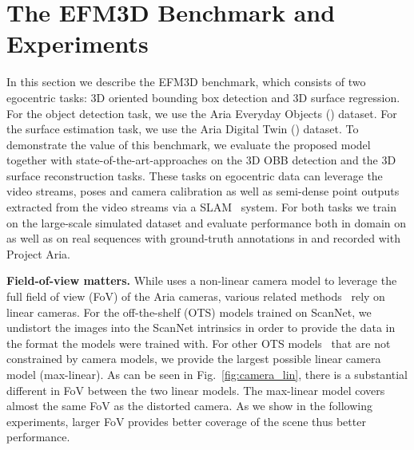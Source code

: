 \section{The EFM3D Benchmark and Experiments}
In this section we describe the EFM3D benchmark, which consists of two egocentric tasks: 3D oriented bounding box detection and 3D surface regression. For the object detection task, we use the Aria Everyday Objects (\AEO{}) dataset. For the surface estimation task, we use the Aria Digital Twin (\ADT{}) dataset.
%
To demonstrate the value of this benchmark, we evaluate the proposed \EFMmodel{} model together with state-of-the-art-approaches on the 3D OBB detection and the 3D surface reconstruction tasks.
These tasks on egocentric data can leverage the video streams, poses and camera calibration as well as semi-dense point outputs extracted from the video streams via a SLAM~\cite{engel2023project} system. For both tasks we train on the large-scale simulated \ASE{} dataset and evaluate performance both in domain on \ASE{} as well as on real sequences with ground-truth annotations in \ADT{} and \AOThree{} recorded with Project Aria.



\noindent \textbf{Field-of-view matters.} While \EFMmodel{} uses a non-linear camera model to leverage the full field of view (FoV) of the Aria cameras, various related methods~\cite{sun2021neucon,sayed2022simplerecon,rukhovich2022imvoxelnet,Brazil_2023_CVPR} rely on linear cameras. For the off-the-shelf (OTS) models trained on ScanNet, we undistort the images into the ScanNet intrinsics in order to provide the data in the format the models were trained with. For other OTS models~\cite{bhat2023zoedepth,khan2023tcod} that are not constrained by camera models, we provide the largest possible linear camera model (max-linear). As can be seen in Fig.~\ref{fig:camera_lin}, there is a substantial different in FoV between the two linear models. The max-linear model covers almost the same FoV as the distorted camera. As we show in the following experiments, larger FoV provides better coverage of the scene thus better performance.

